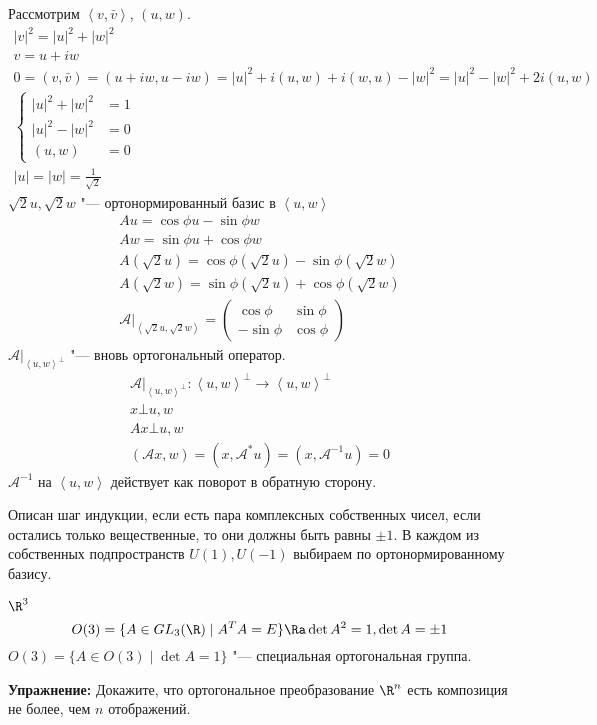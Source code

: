 Рассмотрим $\left<v, \bar v\right>$, $(u, w)$.
\begin{gather*}
	|v|^2 = |u|^2 + |w|^2 \\
	v = u + iw \\
	0 = (v, \bar v) = (u + iw, u - iw) = |u|^2 + i(u, w) + i(w, u) - |w|^2 = |u|^2 - |w|^2 + 2i(u, w) \\
	\left\{ \begin{aligned}
		|u|^2 + |w|^2 &= 1 \\
		|u|^2 - |w|^2 &= 0 \\
		(u, w) &= 0
	\end{aligned}\right. \\
	|u| = |w| = \frac1{\sqrt2}
\end{gather*}
$\sqrt2u, \sqrt2 w$ "--- ортонормированный базис в $\left<u, w\right>$
\begin{gather*}
	Au = \cos \phi u - \sin \phi w \\
	Aw = \sin \phi u + \cos \phi w \\
	A(\sqrt 2 u) = \cos \phi (\sqrt 2 u) - \sin \phi (\sqrt 2 w) \\
	A(\sqrt 2 w) = \sin \phi (\sqrt 2 u) + \cos \phi (\sqrt 2 w) \\
	\mathscr A|_{\left<\sqrt2 u, \sqrt2w\right>} = \begin{pmatrix}
 		 \cos \phi & \sin \phi \\
		-\sin \phi & \cos \phi
 	\end{pmatrix}
\end{gather*}
$\mathscr A|_{\left<u, w\right>^{\bot}}$ "--- вновь ортогональный оператор. 
\begin{gather*}
	\mathscr A|_{\left<u, w\right>^{\bot}} \colon \left<u, w\right>^{\bot}\to \left<u,w\right>^{\bot} \\
	x \bot u, w \\
	Ax \bot u, w \\
	(\mathscr Ax, w) = (x, \mathscr A^*u) = (x, \mathscr A^{-1}u) = 0
\end{gather*}
$\mathscr A^{-1}$ на $\left<u, w\right>$ действует как поворот в обратную сторону. 

Описан шаг индукции, если есть пара комплексных собственных чисел,
если остались только вещественные, то они должны быть равны $\pm 1$.
В каждом из собственных подпространств $U(1), U(-1)$ выбираем по ортонормированному базису. 

\begin{exmp}
	$\R^3$
	\[ O(3) = \{A \in GL_3(\R) \mid A^{T}A = E\} \Ra \det A^2 = 1, \det A = \pm 1 \]
	$O(3) = \{A \in O(3) \mid \det A = 1\} $ "--- специальная ортогональная группа. 
\end{exmp}

\textbf{Упражнение:}
Докажите, что ортогональное преобразование $\R^n$ есть композиция не более, чем $n$ отображений.
